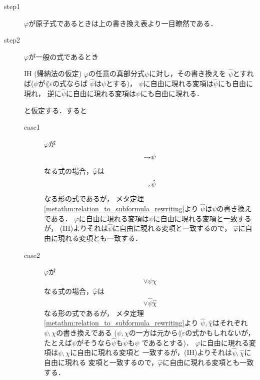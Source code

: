 	\begin{metaprf}\mbox{}
		\begin{description}
			\item[step1] $\varphi$が原子式であるときは上の書き換え表より一目瞭然である．
			
			\item[step2]
				$\varphi$が一般の式であるとき
				\begin{itembox}[l]{IH (帰納法の仮定)}
					$\varphi$の任意の真部分式$\psi$に対し，その書き換えを
					$\hat{\psi}$とすれば($\psi$が$\lang{\varepsilon}$の式ならば
					$\hat{\psi}$は$\psi$とする)，
					$\psi$に自由に現れる変項は$\hat{\psi}$にも自由に現れ，
					逆に$\hat{\psi}$に自由に現れる変項は$\psi$にも自由に現れる．
				\end{itembox}
				と仮定する．すると
				\begin{description}
					\item[case1] $\varphi$が
						\begin{align}
							\rightharpoondown\hspace{-0.25em} \psi
						\end{align}
						なる式の場合，$\hat{\varphi}$は
						\begin{align}
							\rightharpoondown\hspace{-0.25em} \hat{\psi}
						\end{align}
						なる形の式であるが，
						メタ定理\ref{metathm:relation_to_subformula_rewriting}より
						$\hat{\psi}$は$\psi$の書き換えである．
						$\varphi$に自由に現れる変項は$\psi$に自由に現れる変項と一致するが，
						(IH)よりそれは$\hat{\psi}$に自由に現れる変項と一致するので，
						$\hat{\varphi}$に自由に現れる変項とも一致する．
						
					\item[case2] $\varphi$が
						\begin{align}
							\vee \psi \chi
						\end{align}
						なる式の場合，$\hat{\varphi}$は
						\begin{align}
							\vee \hat{\psi} \hat{\chi}
						\end{align}
						なる形の式であるが，
						メタ定理\ref{metathm:relation_to_subformula_rewriting}より
						$\hat{\psi},\hat{\chi}$はそれぞれ$\psi,\chi$の書き換えである
						($\psi,\chi$の一方は元から$\lang{\varepsilon}$の式かもしれないが，
						たとえば$\psi$がそうなら$\hat{\psi}$も$\check{\psi}$も$\psi$
						であるとする)．
						$\varphi$に自由に現れる変項は$\psi,\chi$に自由に現れる変項と
						一致するが，(IH)よりそれは$\hat{\psi},\hat{\chi}$に自由に現れる
						変項と一致するので，$\hat{\varphi}$に自由に現れる変項とも一致する．
					

\end{description}
\end{description}
\end{metaprf}

